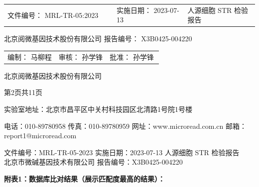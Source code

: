 \documentclass[UTF8,10pt,a4paper,fontset=fandol]{ctexart}
\newcommand{\fieldvalue}[1]{#1}
\newcommand{\handwritten}[1]{#1}
\begin{document}
\noindent
\begin{tabular}{@{}p{0.43\linewidth}p{0.28\linewidth}p{0.29\linewidth}@{}}
文件编号：
\fieldvalue{MRL-TR-05:2023}
&
实施日期：
\fieldvalue{2023-07-13}
&
人源细胞 STR 检验报告
\end{tabular}

\vspace{0.15em}

\noindent
北京阅微基因技术股份有限公司
\hfill
报告编号：
\fieldvalue{X3B0425-004220}

\vspace{2.5em}

\noindent
\begin{tabular}{@{}p{0.33\linewidth}p{0.33\linewidth}p{0.34\linewidth}@{}}
编制：
\fieldvalue{\handwritten{马柳程}}
&
审核：
\fieldvalue{\handwritten{孙学锋}}
&
批准：
\fieldvalue{\handwritten{孙学锋}}
\end{tabular}

\vspace{0.8em}

\begin{center}
北京阅微基因技术股份有限公司
\end{center}

\vfill

\begin{center}
第2页共11页

实验室地址：北京市昌平区中关村科技园区北清路1号院1号楼

电话：010-89780958 \quad 传真：010-89780959 \quad
网址：www.microread.com.cn \quad 邮箱：report1@microread.com
\end{center}

\newpage

\begin{center}
\small
文件编号：MRL-TR-05-2023 \hfill 实施日期：2023-07-13 \hfill 人源细胞 STR 检验报告\\
北京市微碱基因技术有限公司 \hfill 报告编号：X3B0425-004220
\end{center}

\noindent\textbf{附表1：数据库比对结果（展示匹配度最高的结果）：}
\end{document}
